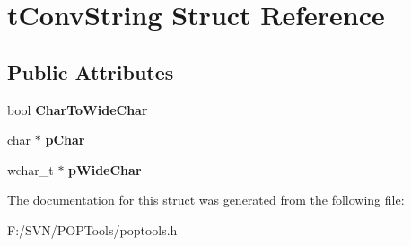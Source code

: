 \hypertarget{structt_conv_string}{\section{t\-Conv\-String Struct Reference}
\label{structt_conv_string}
}
\subsection*{Public Attributes}
\begin{DoxyCompactItemize}
\item 
\hypertarget{structt_conv_string_aea4bd2e820673103e44d269bd8aa6d3c}{bool {\bfseries Char\-To\-Wide\-Char}}\label{structt_conv_string_aea4bd2e820673103e44d269bd8aa6d3c}

\item 
\hypertarget{structt_conv_string_ae63aeff761511a2a640ff27993c276ed}{char $\ast$ {\bfseries p\-Char}}\label{structt_conv_string_ae63aeff761511a2a640ff27993c276ed}

\item 
\hypertarget{structt_conv_string_a1761779ffcdd623333296f81a4ac9e61}{wchar\-\_\-t $\ast$ {\bfseries p\-Wide\-Char}}\label{structt_conv_string_a1761779ffcdd623333296f81a4ac9e61}

\end{DoxyCompactItemize}


The documentation for this struct was generated from the following file\-:\begin{DoxyCompactItemize}
\item 
F\-:/\-S\-V\-N/\-P\-O\-P\-Tools/poptools.\-h\end{DoxyCompactItemize}
